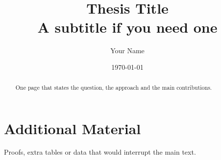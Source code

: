 \documentclass[11pt,a4paper,openany]{report}
\title{Thesis Title\\[1ex]\large A subtitle if you need one}
\author{Your Name}
\date{\today}
\begin{document}
\maketitle

\begin{abstract}
One page that states the question, the approach and the main contributions.
\end{abstract}

\tableofcontents




\appendix
\chapter{Additional Material}
Proofs, extra tables or data that would interrupt the main text.



\end{document}
